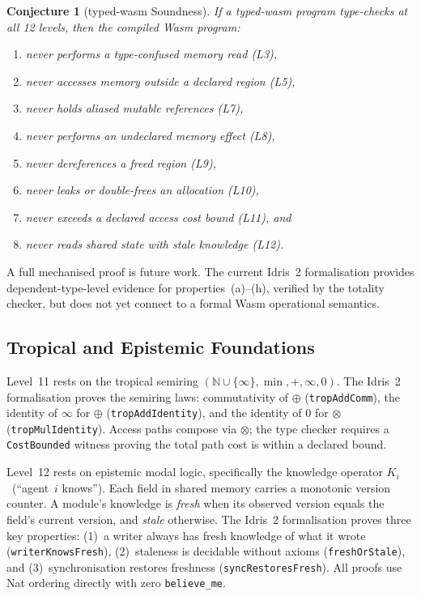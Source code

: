 \documentclass[sigplan,nonacm,screen]{acmart}
\newtheorem{conjecture}{Conjecture}
\begin{document}
\begin{conjecture}[typed-wasm Soundness]
If a typed-wasm program type-checks at all 12 levels, then the compiled
Wasm program:
\begin{enumerate}
  \item[(a)] never performs a type-confused memory read (L3),
  \item[(b)] never accesses memory outside a declared region (L5),
  \item[(c)] never holds aliased mutable references (L7),
  \item[(d)] never performs an undeclared memory effect (L8),
  \item[(e)] never dereferences a freed region (L9),
  \item[(f)] never leaks or double-frees an allocation (L10),
  \item[(g)] never exceeds a declared access cost bound (L11), and
  \item[(h)] never reads shared state with stale knowledge (L12).
\end{enumerate}
\end{conjecture}

A full mechanised proof is future work. The current Idris~2 formalisation
provides dependent-type-level evidence for properties~(a)--(h), verified
by the totality checker, but does not yet connect to a formal Wasm
operational semantics.

\subsection{Tropical and Epistemic Foundations}

Level~11 rests on the tropical semiring $(\mathbb{N} \cup \{\infty\},
\min, +, \infty, 0)$. The Idris~2 formalisation proves the semiring laws:
commutativity of $\oplus$ (\texttt{tropAddComm}), the identity of
$\infty$ for $\oplus$ (\texttt{tropAddIdentity}), and the identity of $0$
for $\otimes$ (\texttt{tropMulIdentity}). Access paths compose via
$\otimes$; the type checker requires a \texttt{CostBounded} witness
proving the total path cost is within a declared bound.

Level~12 rests on epistemic modal logic, specifically the knowledge
operator $K_i$~(``agent~$i$ knows''). Each field in shared memory carries
a monotonic version counter. A module's knowledge is \emph{fresh} when its
observed version equals the field's current version, and \emph{stale}
otherwise. The Idris~2 formalisation proves three key properties:
(1)~a writer always has fresh knowledge of what it wrote
(\texttt{writerKnowsFresh}), (2)~staleness is decidable without axioms
(\texttt{freshOrStale}), and (3)~synchronisation restores freshness
(\texttt{syncRestoresFresh}). All proofs use Nat ordering directly with
zero \texttt{believe\_me}.
\end{document}
